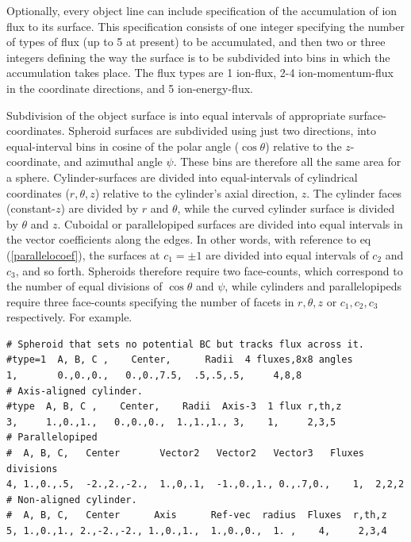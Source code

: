 \documentclass[12pt]{article}
\begin{document}
Optionally, every object line can include specification of the
accumulation of ion flux to its surface. This specification consists
of one integer specifying the number of types of flux (up to 5 at
present) to be accumulated, and then two or three integers defining
the way the surface is to be subdivided into bins in which the
accumulation takes place. The flux types are 1 ion-flux, 2-4
ion-momentum-flux in the coordinate directions, and 5 ion-energy-flux.

Subdivision of the object surface is into equal intervals of
appropriate surface-coordinates. Spheroid surfaces are subdivided
using just two directions, into equal-interval bins in cosine of the
polar angle ($\cos\theta$) relative to the $z$-coordinate, and
azimuthal angle $\psi$. These bins are therefore all the same
area for a sphere. Cylinder-surfaces are divided into equal-intervals of
cylindrical coordinates ($r,\theta,z$) relative to the cylinder's
axial direction, $z$. The cylinder faces (constant-$z$) are divided by
$r$ and $\theta$, while the curved cylinder surface is divided by
$\theta$ and $z$. Cuboidal or parallelopiped surfaces are divided
into equal intervals in the vector coefficients along the edges. In
other words, with reference to eq (\ref{parallelocoef}), the surfaces
at $c_1=\pm1$ are divided into equal intervals of $c_2$ and $c_3$, and
so forth. Spheroids therefore require two face-counts, which
correspond to the number of equal divisions of $\cos\theta$ and
$\psi$, while cylinders and parallelopipeds require three face-counts
specifying the number of facets in $r,\theta,z$ or $c_1,c_2,c_3$
respectively. For example.

\begin{verbatim}
# Spheroid that sets no potential BC but tracks flux across it.
#type=1  A, B, C ,    Center,      Radii  4 fluxes,8x8 angles
1,       0.,0.,0.,   0.,0.,7.5,  .5,.5,.5,     4,8,8
# Axis-aligned cylinder.
#type  A, B, C ,    Center,    Radii  Axis-3  1 flux r,th,z
3,     1.,0.,1.,   0.,0.,0.,  1.,1.,1., 3,    1,     2,3,5
# Parallelopiped
#  A, B, C,   Center       Vector2   Vector2   Vector3   Fluxes divisions
4, 1.,0.,.5,  -2.,2.,-2.,  1.,0,.1,  -1.,0.,1., 0.,.7,0.,    1,  2,2,2
# Non-aligned cylinder.
#  A, B, C,   Center      Axis      Ref-vec  radius  Fluxes  r,th,z
5, 1.,0.,1., 2.,-2.,-2., 1.,0.,1.,  1.,0.,0.,  1. ,    4,     2,3,4
\end{verbatim}
\end{document}
